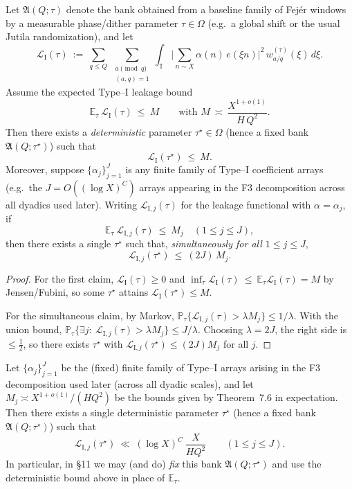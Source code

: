 \begin{lemma}\label{lem:bank-selection}
Let $\mathfrak A(Q;\tau)$ denote the bank obtained from a baseline family of Fejér windows by a measurable phase/dither parameter $\tau\in\Omega$ (e.g.\ a global shift or the usual Jutila randomization), and let
\[
\mathcal L_{\mathrm{I}}(\tau)\ :=\ \sum_{q\le Q}\ \sum_{\substack{a\!\!\!\!\pmod q\\(a,q)=1}}
\int_{\mathbb T}\Big|\sum_{n\sim X}\alpha(n)\,e(\xi n)\Big|^{2}\,w^{(\tau)}_{a/q}(\xi)\,d\xi.
\]
Assume the expected Type--I leakage bound
\[
\mathbb E_{\tau}\ \mathcal L_{\mathrm{I}}(\tau)\ \le\ M\qquad\text{with } M\ \asymp\ \frac{X^{1+o(1)}}{H\,Q^{2}} .
\]
Then there exists a \emph{deterministic} parameter $\tau^\star\in\Omega$ (hence a fixed bank $\mathfrak A(Q;\tau^\star)$) such that
\[
\mathcal L_{\mathrm{I}}(\tau^\star)\ \le\ M.
\]
Moreover, suppose $\{\alpha_j\}_{j=1}^{J}$ is any finite family of Type--I coefficient arrays (e.g.\ the $J=O((\log X)^C)$ arrays appearing in the F3 decomposition across all dyadics used later). Writing $\mathcal L_{\mathrm{I},j}(\tau)$ for the leakage functional with $\alpha=\alpha_j$, if
\[
\mathbb E_{\tau}\ \mathcal L_{\mathrm{I},j}(\tau)\ \le\ M_j \quad (1\le j\le J),
\]
then there exists a single $\tau^\star$ such that, \emph{simultaneously for all $1\le j\le J$},
\[
\mathcal L_{\mathrm{I},j}(\tau^\star)\ \le\ (2J)\,M_j .
\]
\end{lemma}

\begin{proof}
For the first claim, $\mathcal L_{\mathrm{I}}(\tau)\ge 0$ and $\inf_{\tau}\mathcal L_{\mathrm{I}}(\tau)\ \le\ \mathbb E_{\tau}\mathcal L_{\mathrm{I}}(\tau)=M$ by Jensen/Fubini, so some $\tau^\star$ attains $\mathcal L_{\mathrm{I}}(\tau^\star)\le M$.

For the simultaneous claim, by Markov,
\(
\mathbb P_{\tau}\{\mathcal L_{\mathrm{I},j}(\tau) > \lambda M_j\}\le 1/\lambda.
\)
With the union bound,
\(
\mathbb P_{\tau}\{\exists j:\ \mathcal L_{\mathrm{I},j}(\tau) > \lambda M_j\}\le J/\lambda.
\)
Choosing $\lambda=2J$, the right side is $\le \tfrac12$, so there exists $\tau^\star$ with $\mathcal L_{\mathrm{I},j}(\tau^\star)\le (2J)M_j$ for all $j$.
\end{proof}

\begin{corollary}\label{cor:fix-bank}
Let $\{\alpha_j\}_{j=1}^{J}$ be the (fixed) finite family of Type--I arrays arising in the F3 decomposition used later (across all dyadic scales), and let $M_j\asymp X^{1+o(1)}/(H Q^2)$ be the bounds given by Theorem~7.6 in expectation. Then there exists a single deterministic parameter $\tau^\star$ (hence a fixed bank $\mathfrak A(Q;\tau^\star)$) such that
\[
\mathcal L_{\mathrm{I},j}(\tau^\star)\ \ll\ (\log X)^C\ \frac{X}{H Q^2}\qquad(1\le j\le J).
\]
In particular, in §11 we may (and do) \emph{fix} this bank $\mathfrak A(Q;\tau^\star)$ and use the deterministic bound above in place of $\mathbb E_\tau$.
\end{corollary}

